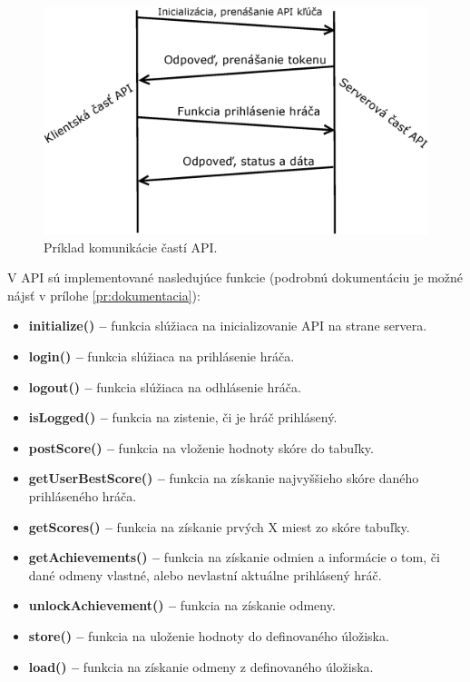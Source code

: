 \begin{figure}[h]
  \centering
  \includegraphics[scale=0.45]{fig/implementacia-komunikacia.eps}
  \caption{Príklad komunikácie častí API.}
  \label{fig:implementaciakomunikacia}
\end{figure}

V API sú implementované nasledujúce funkcie (podrobnú dokumentáciu je možné nájsť v prílohe \ref{pr:dokumentacia}):
\begin{itemize}
\item \textbf{initialize() –} funkcia slúžiaca na inicializovanie API na strane servera.
\item \textbf{login() –} funkcia slúžiaca na prihlásenie hráča.
\item \textbf{logout() –} funkcia slúžiaca na odhlásenie hráča.
\item \textbf{isLogged() –} funkcia na zistenie, či je hráč prihlásený.
\item \textbf{postScore() –} funkcia na vloženie hodnoty skóre do tabuľky.
\item \textbf{getUserBestScore() –} funkcia na získanie najvyššieho skóre daného prihláseného hráča.
\item \textbf{getScores() –} funkcia na získanie prvých X miest zo skóre tabuľky.
\item \textbf{getAchievements() –} funkcia na získanie odmien a informácie o tom, či dané odmeny vlastné, alebo nevlastní aktuálne prihlásený hráč.
\item \textbf{unlockAchievement() –} funkcia na získanie odmeny.
\item \textbf{store() –} funkcia na uloženie hodnoty do definovaného úložiska.
\item \textbf{load() –} funkcia na získanie odmeny z definovaného úložiska.
\end{itemize}

